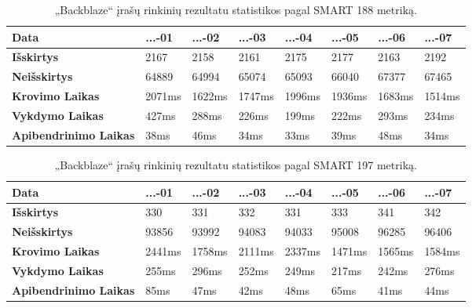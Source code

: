 \documentclass{VUMIFPSkursinis}
\begin{document}
\begin{table}[H]
\caption{„Backblaze“ įrašų rinkinių rezultatu statistikos pagal SMART 188 metriką.}
\label{tab:time188}
{\begin{tabular}{|l|l|l|l|l|l|l|l|}
\hline
\textbf{Data}                 & ...-01	   & ...-02     & ...-03     & ...-04 	  & ...-05     & ...-06     & ...-07     \\ \hline
\textbf{Išskirtys}            & 2167       & 2158       & 2161       & 2175       & 2177       & 2163       & 2192       \\ \hline
\textbf{Neišskirtys}          & 64889      & 64994      & 65074      & 65093      & 66040      & 67377      & 67465      \\ \hline
\textbf{Krovimo Laikas}       & 2071ms     & 1622ms     & 1747ms     & 1996ms     & 1936ms     & 1683ms     & 1514ms     \\ \hline
\textbf{Vykdymo Laikas}       & 427ms      & 288ms      & 226ms      & 199ms      & 222ms      & 293ms      & 234ms      \\ \hline
\textbf{Apibendrinimo Laikas} & 38ms       & 46ms       & 34ms       & 33ms       & 39ms       & 48ms       & 34ms       \\ \hline
\end{tabular}}
\end{table}

\begin{table}[H]
\centering
\caption{„Backblaze“ įrašų rinkinių rezultatu statistikos pagal SMART 197 metriką.}
\label{tab:time197}
{\begin{tabular}{|l|l|l|l|l|l|l|l|}
\hline
\textbf{Data}                 & ...-01	   & ...-02     & ...-03     & ...-04 	  & ...-05     & ...-06     & ...-07     \\ \hline
\textbf{Išskirtys}            & 330        & 331        & 332        & 331        & 333        & 341        & 342        \\ \hline
\textbf{Neišskirtys}          & 93856      & 93992      & 94083      & 94033      & 95008      & 96285      & 96406      \\ \hline
\textbf{Krovimo Laikas}       & 2441ms     & 1758ms     & 2111ms     & 2337ms     & 1471ms     & 1565ms     & 1584ms     \\ \hline
\textbf{Vykdymo Laikas}       & 255ms      & 296ms      & 252ms      & 249ms      & 217ms      & 242ms      & 276ms      \\ \hline
\textbf{Apibendrinimo Laikas} & 85ms       & 47ms       & 42ms       & 48ms       & 65ms       & 41ms       & 44ms       \\ \hline
\end{tabular}}
\end{table}
\end{document}
